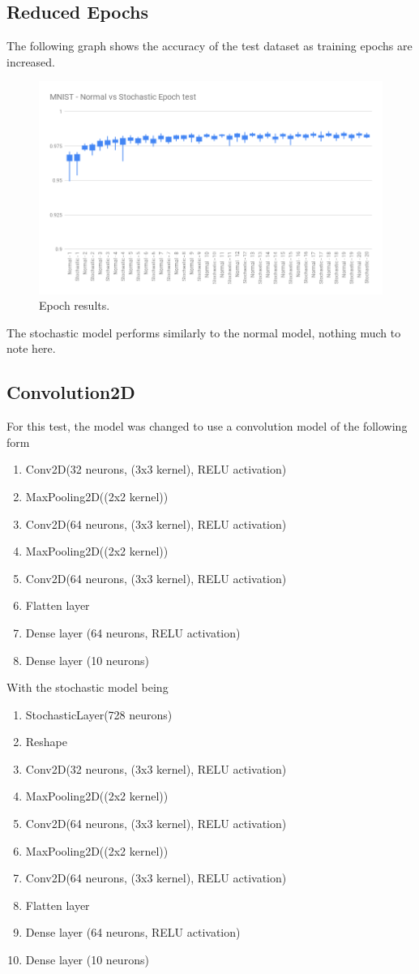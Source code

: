 \documentclass[a4paper,oneside,phd,etd]{BYUPhys}
\begin{document}
\subsection{Reduced Epochs}
The following graph shows the accuracy of the test dataset as training epochs are increased.
\begin{figure}[H]
\centering
\includegraphics[width=12cm]{results/epoch.png}
\caption{Epoch results.}
\label{fig:epoch}
\end{figure}
The stochastic model performs similarly to the normal model, nothing much to note here.

\subsection{Convolution2D}
For this test, the model was changed to use a convolution model of the following form
\begin{enumerate}
	\item Conv2D(32 neurons, (3x3 kernel), RELU activation)
	\item MaxPooling2D((2x2 kernel))
	\item Conv2D(64 neurons, (3x3 kernel), RELU activation)
	\item MaxPooling2D((2x2 kernel))
	\item Conv2D(64 neurons, (3x3 kernel), RELU activation)
	\item Flatten layer
	\item Dense layer (64 neurons, RELU activation)
	\item Dense layer (10 neurons)
\end{enumerate}
With the stochastic model being
\begin{enumerate}
	\item StochasticLayer(728 neurons)
	\item Reshape
	\item Conv2D(32 neurons, (3x3 kernel), RELU activation)
	\item MaxPooling2D((2x2 kernel))
	\item Conv2D(64 neurons, (3x3 kernel), RELU activation)
	\item MaxPooling2D((2x2 kernel))
	\item Conv2D(64 neurons, (3x3 kernel), RELU activation)
	\item Flatten layer
	\item Dense layer (64 neurons, RELU activation)
	\item Dense layer (10 neurons)
\end{enumerate}
\end{document}
